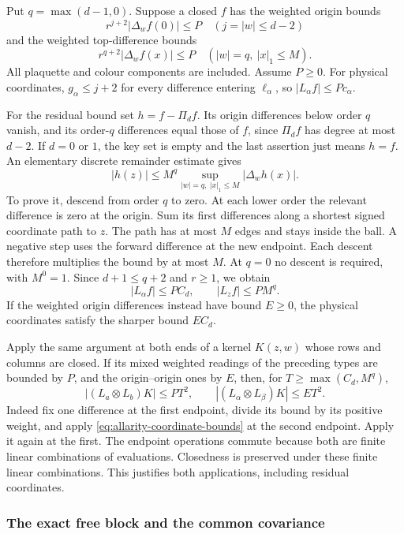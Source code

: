 Put $q=\max(d-1,0)$. Suppose a closed $f$ has the weighted
origin bounds
\[
 r^{j+2}|\Delta_w f(0)|\le P\quad(j=|w|\le d-2)
\]
and the weighted top-difference bounds
\[
 r^{q+2}|\Delta_w f(x)|\le P
             \quad(|w|=q,\ |x|_1\le M).
\]
All plaquette and colour components are included. Assume $P\ge0$.
For physical coordinates, $g_\alpha\le j+2$ for every difference
entering $\ell_\alpha$, so
$|L_\alpha f|\le Pc_\alpha$.

For the residual bound set $h=f-\Pi_df$. Its origin differences
below order $q$ vanish, and its order-$q$ differences equal those
of $f$, since $\Pi_df$ has degree at most $d-2$. If $d=0$ or $1$,
the key set is empty and the last assertion just means $h=f$.
An elementary discrete remainder estimate gives
\[
 |h(z)|\le M^q\sup_{|w|=q,\ |x|_1\le M}|\Delta_w h(x)|.
\]
To prove it, descend from order $q$ to zero. At each lower order
the relevant difference is zero at the origin. Sum its first
differences along a shortest signed coordinate path to $z$.
The path has at most $M$ edges and stays inside the ball. A
negative step uses the forward difference at the new endpoint.
Each descent therefore multiplies the bound by at most $M$.
At $q=0$ no descent is required, with $M^0=1$.
Since $d+1\le q+2$ and $r\ge1$, we obtain
\begin{equation}\label{eq:allarity-coordinate-bounds}
 |L_\alpha f|\le PC_d,\qquad |L_zf|\le PM^q.
\end{equation}
If the weighted origin differences instead have bound $E\ge0$,
the physical coordinates satisfy the sharper bound $EC_d$.

Apply the same argument at both ends of a kernel $K(z,w)$ whose
rows and columns are closed. If its mixed weighted readings of
the preceding types are bounded by $P$, and the origin--origin
ones by $E$, then, for $T\ge\max(C_d,M^q)$,
\begin{equation}\label{eq:allarity-two-reader-bounds}
 |(L_a\otimes L_b)K|\le PT^2,\qquad
 |(L_\alpha\otimes L_\beta)K|\le ET^2.
\end{equation}
Indeed fix one difference at the first endpoint, divide its bound
by its positive weight, and apply
\eqref{eq:allarity-coordinate-bounds} at the second endpoint.
Apply it again at the first. The endpoint operations commute
because both are finite linear combinations of evaluations.
Closedness is preserved under these finite linear combinations.
This justifies both applications, including residual coordinates.

\subsubsection{The exact free block and the common covariance}

